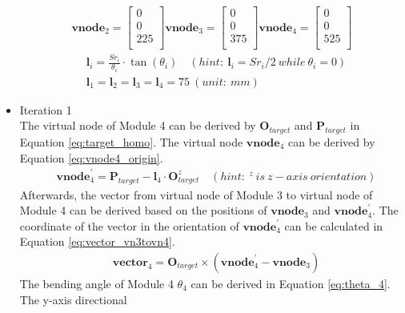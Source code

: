 \begin{itemize}
\begin{align}
        \textbf{vnode}_{2} = \begin{bmatrix} 0 \\ 0 \\ 225 \\ \end{bmatrix} 
        \textbf{vnode}_{3} = \begin{bmatrix} 0 \\ 0 \\ 375 \\ \end{bmatrix} 
        \textbf{vnode}_{4} = \begin{bmatrix} 0 \\ 0 \\ 525 \\ \end{bmatrix} 
        \label{eq:virtual_node_initial} 
    \end{align}
    \begin{align}
        &\textbf{l}_{i} = \frac{Sr_i}{\theta_i}\cdot \tan(\theta_i)
        \quad (hint: \ \textbf{l}_{i} = {Sr}_i/2 \ while \ \theta_i = 0) \label{eq:virtual_length}\\
        &\textbf{l}_{1} = \textbf{l}_{2} = \textbf{l}_{3} = \textbf{l}_{4} = 75 \ (unit: \ mm) \nonumber
    \end{align}
    \item Iteration 1 \\ %
    The virtual node of Module 4 can be derived by $\textbf{O}_{target}$ and $\textbf{P}_{target}$ in Equation 
    \ref{eq:target_homo}. The virtual node $\textbf{vnode}_{4}$ can be derived by Equation \ref{eq:vnode4_origin}.
    \begin{align}
        &\textbf{vnode}_{4}^{'} = \textbf{P}_{target} - \textbf{l}_{4} \cdot \textbf{O}_{target}^{z} \quad 
        (hint: \ ^{z} \ is \ z-axis \ orientation)
        \label{eq:vnode4_origin}
    \end{align}
    Afterwards, the vector from virtual node of Module 3 to virtual node of Module 4 can be derived based on the 
    positions of $\textbf{vnode}_{3}$ and $\textbf{vnode}_{4}^{'}$. The coordinate of the vector in the orientation 
    of $\textbf{vnode}_{4}^{'}$ can be calculated in Equation \ref{eq:vector_vn3tovn4}. 
    \begin{align}
        &\textbf{vector}_{4} = \textbf{O}_{target} \times (\textbf{vnode}_{4}^{'} - \textbf{vnode}_{3}) 
        \label{eq:vector_vn3tovn4} 
    \end{align}
    The bending angle of Module 4 $\theta_4$ can be derived in Equation \ref{eq:theta_4}. The y-axis directional 

\end{itemize}
